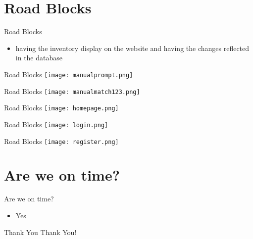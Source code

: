 \documentclass[aspectratio=1610]{beamer}
\begin{document}
\section{Road Blocks}
\begin{frame}{Road Blocks}
    \begin{itemize}
        \item having the inventory display on the website and having the changes reflected in the database
    \end{itemize}
\end{frame}
\begin{frame}{Road Blocks}  
    \texttt{[image: manualprompt.png]}
\end{frame}
\begin{frame}{Road Blocks}
    \texttt{[image: manualmatch123.png]}
\end{frame}
\begin{frame}{Road Blocks}
    \texttt{[image: homepage.png]}
\end{frame}
\begin{frame}{Road Blocks}
    \texttt{[image: login.png]}
\end{frame}
\begin{frame}{Road Blocks}
    \texttt{[image: register.png]}
\end{frame}
\section{Are we on time?}
\begin{frame}{Are we on time?}
    \begin{itemize}
        \item Yes
    \end{itemize}
\end{frame}

\begin{frame}{Thank You}
    \centering
    \Huge Thank You!
\end{frame}
\end{document}
